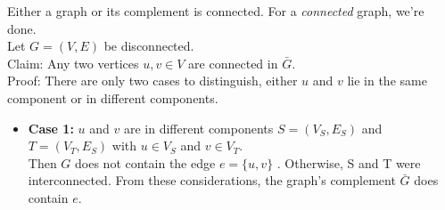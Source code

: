 \documentclass[a4paper]{article}
\begin{document}
	\begin{solution}{3}
		\begin{theorem}{Either a graph or its complement is connected.}
			For a \emph{connected} graph, we're done.\\
			
		
			Let $G = (V, E)$ be disconnected. \\
			Claim: Any two vertices $u,v \in V$ are connected in $\bar{G}$. \\
			Proof: There are only two cases to distinguish, either $u$ and $v$ lie in the same component or in different components. 

			\begin{itemize}
				\item  \textbf{Case 1: } $u$ and $v$ are in different components $S = (V_S, E_S)$ and $T = (V_T, E_S)$ with $u \in V_S$ and $v \in V_T$.\\
				Then $G$ does not contain the edge $e = \{u, v\}$ . Otherwise, S and T were interconnected. From these considerations, the graph's complement $\bar{G}$ does contain $e$.
				\begin{center}
				\end{center}


\end{itemize}
\end{theorem}
\end{solution}
\end{document}
